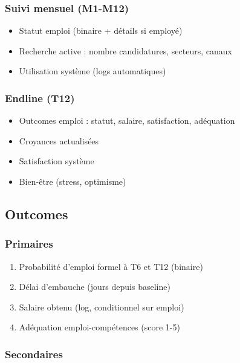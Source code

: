 \documentclass[12pt]{article}
\begin{document}
\subsubsection{Suivi mensuel (M1-M12)}

\begin{itemize}
    \item Statut emploi (binaire + détails si employé)
    \item Recherche active : nombre candidatures, secteurs, canaux
    \item Utilisation système (logs automatiques)
\end{itemize}

\subsubsection{Endline (T12)}

\begin{itemize}
    \item Outcomes emploi : statut, salaire, satisfaction, adéquation
    \item Croyances actualisées
    \item Satisfaction système
    \item Bien-être (stress, optimisme)
\end{itemize}

\subsection{Outcomes}

\subsubsection{Primaires}

\begin{enumerate}
    \item Probabilité d'emploi formel à T6 et T12 (binaire)
    \item Délai d'embauche (jours depuis baseline)
    \item Salaire obtenu (log, conditionnel sur emploi)
    \item Adéquation emploi-compétences (score 1-5)
\end{enumerate}

\subsubsection{Secondaires}
\end{document}
